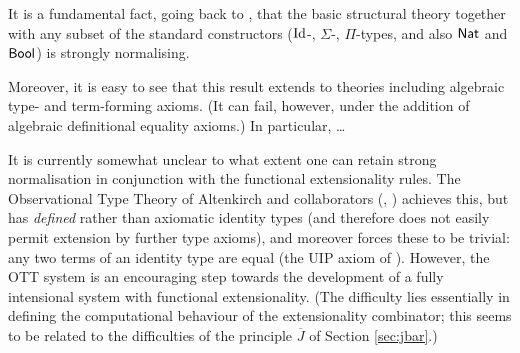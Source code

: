 \documentclass{amsart}
\newcommand{\Jbar}{\overline{J}}
\begin{document}
  It is a fundamental fact, going back to \cite{martin-lof:predicative-part}, that the basic structural theory together with any subset of the standard constructors ($\mathrm{Id}$-, $\Sigma$-, $\Pi$-types, and also $\mathsf{Nat}$ and $\mathsf{Bool}$) is strongly normalising.

Moreover, it is easy to see  that this result extends to theories including algebraic type- and term-forming axioms.  (It can fail, however, under the addition of algebraic definitional equality axioms.)  In particular, \ldots


It is currently somewhat unclear to what extent one can retain strong normalisation in conjunction with the functional extensionality rules.  The Observational Type Theory of Altenkirch and collaborators (\cite{altenkirch:ott}, \cite{altenkirch-mcbride-swierstra}) achieves this, but has \emph{defined} rather than axiomatic identity types (and therefore does not easily permit extension by further type axioms), and moreover forces these to be trivial: any two terms of an identity type are equal (the UIP axiom of \cite{hofmann:extensional??}).  However, the OTT system is an encouraging step towards the development of a fully intensional system with functional extensionality.  (The difficulty lies essentially in defining the computational behaviour of the extensionality combinator; this seems to be related to the difficulties of the principle $\Jbar$ of Section \ref{sec:jbar}.)
\end{document}
